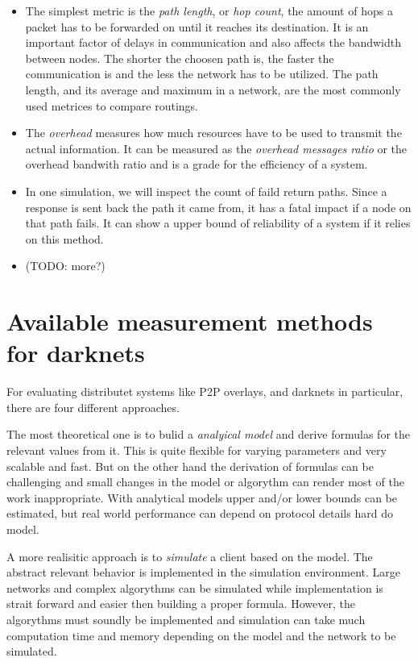 \begin{itemize}
\item The simplest metric is the \emph{path length}, or \emph{hop count}, the amount of hops a packet has to be forwarded on until it reaches its destination. It is an important factor of delays in communication and also affects the bandwidth between nodes. The shorter the choosen path is, the faster the communication is and the less the network has to be utilized. The path length, and its average and maximum in a network, are the most commonly used metrices to compare routings.

\item The \emph{overhead} measures how much resources have to be used to transmit the actual information. It can be measured as the \emph{overhead messages ratio} or the overhead bandwith ratio and is a grade for the efficiency of a system.

\item In one simulation, we will inspect the count of faild return paths. Since a response is sent back the path it came from, it has a fatal impact if a node on that path fails. It can show a upper bound of reliability of a system if it relies on this method.

\item (TODO: more?)
\end{itemize}

\section{Available measurement methods for darknets}

For evaluating distributet systems like P2P overlays, and darknets in particular, there are four different approaches.

The most theoretical one is to bulid a \emph{analyical model} and derive formulas for the relevant values from it. This is quite flexible for varying parameters and very scalable and fast. But on the other hand the derivation of formulas can be challenging and small changes in the model or algorythm can render most of the work inappropriate. With analytical models upper and/or lower bounds can be estimated, but real world performance can depend on protocol details hard do model.

A more realisitic approach is to \emph{simulate} a client based on the model. The abstract relevant behavior is implemented in the simulation environment. Large networks and complex algorythms can be simulated while implementation is strait forward and easier then building a proper formula. However, the algorythms must soundly be implemented and simulation can take much computation time and memory depending on the model and the network to be simulated.

